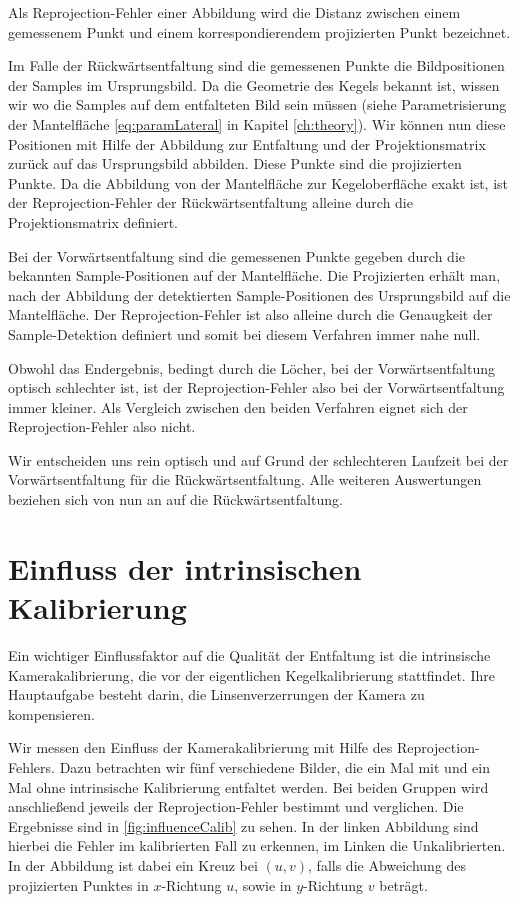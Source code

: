 Als Reprojection-Fehler einer Abbildung wird die Distanz zwischen einem gemessenem Punkt und einem korrespondierendem projizierten Punkt bezeichnet. 

Im Falle der Rückwärtsentfaltung sind die gemessenen Punkte die Bildpositionen der Samples im Ursprungsbild. Da die Geometrie des Kegels bekannt ist, wissen wir wo die Samples auf dem entfalteten Bild sein müssen (siehe Parametrisierung der Mantelfläche \ref{eq:paramLateral} in Kapitel \ref{ch:theory}). Wir können nun diese Positionen mit Hilfe der Abbildung zur Entfaltung und der Projektionsmatrix zurück auf das Ursprungsbild abbilden. Diese Punkte sind die projizierten Punkte. Da die Abbildung von der Mantelfläche zur Kegeloberfläche exakt ist, ist der Reprojection-Fehler der Rückwärtsentfaltung alleine durch die Projektionsmatrix definiert. 

Bei der Vorwärtsentfaltung sind die gemessenen Punkte gegeben durch die bekannten Sample-Positionen auf der Mantelfläche. Die Projizierten erhält man, nach der Abbildung der detektierten Sample-Positionen des Ursprungsbild auf die Mantelfläche. Der Reprojection-Fehler ist also alleine durch die Genaugkeit der Sample-Detektion definiert und somit bei diesem Verfahren immer nahe null. 

Obwohl das Endergebnis, bedingt durch die Löcher, bei der Vorwärtsentfaltung optisch schlechter ist, ist der Reprojection-Fehler also bei der Vorwärtsentfaltung immer kleiner. 
Als Vergleich zwischen den beiden Verfahren eignet sich der Reprojection-Fehler also nicht.

Wir entscheiden uns rein optisch und auf Grund der schlechteren Laufzeit bei der Vorwärtsentfaltung für die Rückwärtsentfaltung. 
Alle weiteren Auswertungen beziehen sich von nun an auf die Rückwärtsentfaltung.

\section{Einfluss der intrinsischen Kalibrierung}
Ein wichtiger Einflussfaktor auf die Qualität der Entfaltung ist die intrinsische Kamerakalibrierung, die vor der eigentlichen Kegelkalibrierung stattfindet. Ihre Hauptaufgabe besteht darin, die Linsenverzerrungen der Kamera zu kompensieren. 

Wir messen den Einfluss der Kamerakalibrierung mit Hilfe des Reprojection-Fehlers. Dazu betrachten wir fünf verschiedene Bilder, die ein Mal mit und ein Mal ohne intrinsische Kalibrierung entfaltet werden. Bei beiden Gruppen wird anschließend jeweils der Reprojection-Fehler bestimmt und verglichen. Die Ergebnisse sind in \ref{fig:influenceCalib} zu sehen. In der linken Abbildung sind hierbei die Fehler im kalibrierten Fall zu erkennen, im Linken die Unkalibrierten. In der Abbildung ist dabei ein Kreuz bei $(u,v)$, falls die Abweichung des projizierten Punktes in $x$-Richtung $u$, sowie in $y$-Richtung $v$ beträgt. 

